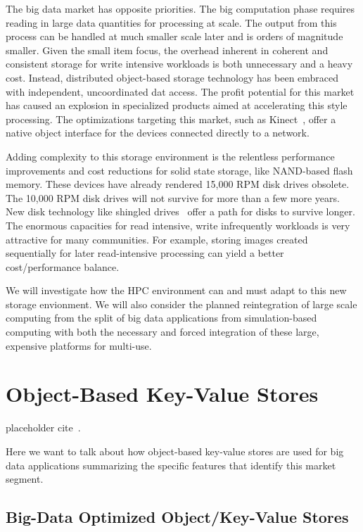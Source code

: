 The big data market has opposite priorities. The big computation phase requires
reading in large data quantities for processing at scale. The output from this
process can be handled at much smaller scale later and is orders of magnitude
smaller. Given the small item focus, the overhead inherent in coherent and
consistent storage for write intensive workloads is both unnecessary and a
heavy cost. Instead, distributed object-based storage technology has been
embraced with independent, uncoordinated dat access. The profit potential for
this market has caused an explosion in specialized products aimed at
accelerating this style processing.  The optimizations targeting this market,
such as Kinect~\cite{segate:kinect}, offer a native object interface for the
devices connected directly to a network.

Adding complexity to this storage environment is the relentless performance
improvements and cost reductions for solid state storage, like NAND-based flash
memory. These devices have already rendered 15,000 RPM disk drives obsolete.
The 10,000 RPM disk drives will not survive for more than a few more years.
New disk technology like shingled drives~\cite{shingled-media} offer a path for
disks to survive longer. The enormous capacities for read intensive, write
infrequently workloads is very attractive for many communities. For example,
storing images created sequentially for later read-intensive processing can
yield a better cost/performance balance.

We will investigate how the HPC environment can and must adapt to this new
storage envionment. We will also consider the planned reintegration of large
scale computing from the split of big data applications from simulation-based
computing with both the necessary and forced integration of these large,
expensive platforms for multi-use.

\section{Object-Based Key-Value Stores}\label{sec:intro}
placeholder cite~\cite{ilyas2004hsn}.

Here we want to talk about how object-based key-value stores are used for big
data applications summarizing the specific features that identify this market
segment.

\subsection{Big-Data Optimized Object/Key-Value Stores}

